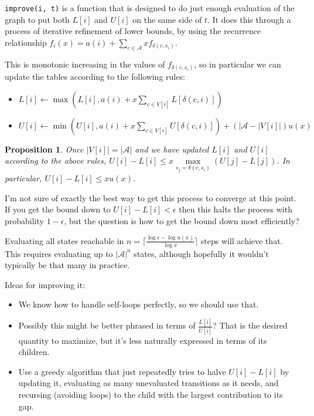\documentclass[a4paper]{book}
\newtheorem{proposition}{Proposition}[section]
\begin{document}
\texttt{improve(i, t)} is a function that is designed to do just enough evaluation of the graph to put both \(L[i]\) and \(U[i]\) on the same side of \(t\).
It does this through a process of iterative refinement of lower bounds,
by using the recurrence relationship \(f_i(x) = a(i) + \sum\limits_{c \in \mathcal{A}} x f_{\delta(c, s_i)}\).

This is monotonic increasing in the values of \(f_{\delta(c, s_i)}\),
so in particular we can update the tables according to the following rules:

\begin{itemize}
\item \(L[i] \leftarrow \max(L[i], a(i) + x \sum\limits_{c \in V[i]} L[\delta(c, i)])\)
\item \(U[i] \leftarrow \min(U[i], a(i) + x \sum\limits_{c \in V[i]} U[\delta(c, i)]) + (|\mathcal{A} - |V[i]|)u(x)\)
\end{itemize}

\begin{proposition}
Once \(|V[i]| = |\mathcal{A}|\) and we have updated \(L[i]\) and \(U[i]\) according to the above rules,
\(U[i] - L[i] \leq x \max\limits_{s_j = \delta(c, s_i)} (U[j] - L[j])\).
In particular, \(U[i] - L[i] \leq x u(x)\).
\end{proposition}

I'm not sure of exactly the best way to get this process to converge at this point.
If you get the bound down to \(U[i] - L[i] < \epsilon\) then this halts the process with probability \(1 - \epsilon\),
but the question is how to get the bound down most efficiently?

Evaluating all states reachable in \(n = \lceil\frac{\log \epsilon - \log u(x)}{\log x}\rceil\) steps will achieve that.
This requires evaluating up to \(|\mathcal{A}|^n\) states,
although hopefully it wouldn't typically be that many in practice.

Ideas for improving it:

\begin{itemize}
\item We know how to handle self-loops perfectly, so we should use that.
\item Possibly this might be better phrased in terms of \(\frac{L[i]}{U[i]}\)?
That is the desired quantity to maximize, but it's less naturally expressed in terms of its children.
\item Use a greedy algorithm that just repeatedly tries to halve \(U[i] - L[i]\) by updating it,
evaluating as many unevaluated transitions as it needs, and recursing (avoiding loops) to the child with the largest contribution to its gap.
\end{itemize}
\end{document}
